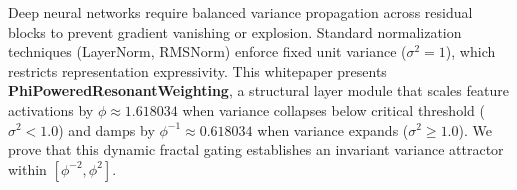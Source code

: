 \begin{abstractbox}
Deep neural networks require balanced variance propagation across residual blocks to prevent gradient vanishing or explosion. Standard normalization techniques (LayerNorm, RMSNorm) enforce fixed unit variance ($\sigma^2 = 1$), which restricts representation expressivity. This whitepaper presents \textbf{PhiPoweredResonantWeighting}, a structural layer module that scales feature activations by $\phi \approx 1.618034$ when variance collapses below critical threshold ($\sigma^2 < 1.0$) and damps by $\phi^{-1} \approx 0.618034$ when variance expands ($\sigma^2 \ge 1.0$). We prove that this dynamic fractal gating establishes an invariant variance attractor within $[\phi^{-2}, \phi^2]$.
\end{abstractbox}